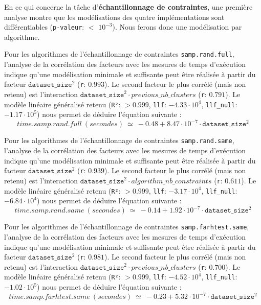 			
			En ce qui concerne la tâche d'\textbf{échantillonnage de contraintes}, une première analyse montre que les modélisations des quatre implémentations sont différentiables  (\texttt{p-valeur}: $<$ \texttt{$10^{-3}$}). Nous ferons donc une modélisation par algorithme.
			
			Pour les algorithmes de l'échantillonnage de contraintes \texttt{samp.rand.full}, l'analyse de la corrélation des facteurs avec les mesures de temps d'exécution indique qu'une modélisation minimale et suffisante peut être réalisée à partir du facteur $\texttt{dataset\_size}^{2}$ (\texttt{r}: $0.993$).
			Le second facteur le plus corrélé (mais non retenu) est l'interaction $\texttt{dataset\_size}^{2} \cdot previous\_nb\_clusters$ (\texttt{r}: $0.791$).
			Le modèle linéaire généralisé retenu (\texttt{R²}: $> 0.999$, \texttt{llf}: $-4.33 \cdot 10^{4}$, \texttt{llf\_null}: $-1.17 \cdot 10^{5}$) nous permet de déduire l'équation suivante :
			\begin{equation}
				time.samp.rand.full~(secondes)~
				\simeq~-0.48 + 8.47 \cdot 10^{-7} \cdot \texttt{dataset\_size}^{2}
			\end{equation}
			
			Pour les algorithmes de l'échantillonnage de contraintes \texttt{samp.rand.same}, l'analyse de la corrélation des facteurs avec les mesures de temps d'exécution indique qu'une modélisation minimale et suffisante peut être réalisée à partir du facteur $\texttt{dataset\_size}^{2}$ (\texttt{r}: $0.939$).
			Le second facteur le plus corrélé (mais non retenu) est l'interaction $\texttt{dataset\_size}^{2} \cdot algorithm\_nb\_constraints$ (\texttt{r}: $0.611$).
			Le modèle linéaire généralisé retenu (\texttt{R²}: $> 0.999$, \texttt{llf}: $-3.17 \cdot 10^{4}$, \texttt{llf\_null}: $-6.84 \cdot 10^{4}$) nous permet de déduire l'équation suivante :
			\begin{equation}
				time.samp.rand.same~(secondes)~
				\simeq~-0.14 + 1.92 \cdot 10^{-7} \cdot \texttt{dataset\_size}^{2}
			\end{equation}
			
			Pour les algorithmes de l'échantillonnage de contraintes \texttt{samp.farhtest.same}, l'analyse de la corrélation des facteurs avec les mesures de temps d'exécution indique qu'une modélisation minimale et suffisante peut être réalisée à partir du facteur $\texttt{dataset\_size}^{2}$ (\texttt{r}: $0.981$).
			Le second facteur le plus corrélé (mais non retenu) est l'interaction $\texttt{dataset\_size}^{2} \cdot previous\_nb\_clusters$ (\texttt{r}: $0.700$).
			Le modèle linéaire généralisé retenu (\texttt{R²}: $> 0.999$, \texttt{llf}: $-4.52 \cdot 10^{4}$, \texttt{llf\_null}: $-1.02 \cdot 10^{5}$) nous permet de déduire l'équation suivante :
			\begin{equation}
				time.samp.farhtest.same~(secondes)~
				\simeq~-0.23 + 5.32 \cdot 10^{-7} \cdot \texttt{dataset\_size}^{2}
			\end{equation}
			
